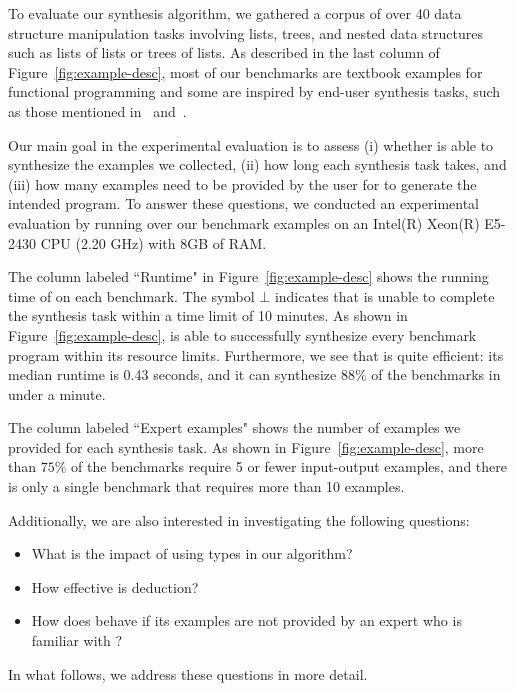 To evaluate our synthesis algorithm, we gathered a corpus of over
40  data structure manipulation tasks involving lists, trees, and nested data structures 
such as lists of lists or trees of lists.  As described in the last column of
Figure~\ref{fig:example-desc},
most of our benchmarks are textbook examples for
functional programming and some are inspired by end-user
synthesis tasks, such as those mentioned in~
and~.

Our main goal in the experimental evaluation is to assess (i) whether
\sys is able to synthesize the examples we collected, (ii) how long
each synthesis task takes, and (iii) how many examples need to be
provided by the user for \sys to generate the intended program.  To
answer these questions, we conducted an experimental evaluation by
running \sys over our benchmark examples on an Intel(R) Xeon(R)
E5-2430 CPU (2.20 GHz) with 8GB of RAM.

The column labeled ``Runtime" in Figure~\ref{fig:example-desc} shows
the running time of \sys on each benchmark. The symbol $\bot$
indicates that \sys is unable to complete the synthesis task within a
time limit of 10 minutes. As shown in Figure~\ref{fig:example-desc},
\sys is able to successfully synthesize every benchmark program within
its resource limits. Furthermore, we see that \sys is quite efficient:
its median runtime is 0.43 seconds, and it can synthesize
88\% of the benchmarks in under a minute.

The column labeled ``Expert examples" shows the number of examples we
provided for each synthesis task.  As shown in
Figure~\ref{fig:example-desc}, more than $75\%$ of the benchmarks
require 5 or fewer input-output examples, and there is only a single
benchmark that requires more than 10 examples.

Additionally, we are also interested in investigating the following questions:
\begin{itemize}
\item What is the impact of using types in our algorithm?
\item How effective is deduction?
\item How does \sys behave if its examples are not
  provided by an expert who is familiar with \sys?
\end{itemize}
In what follows, we address these questions in more detail.


